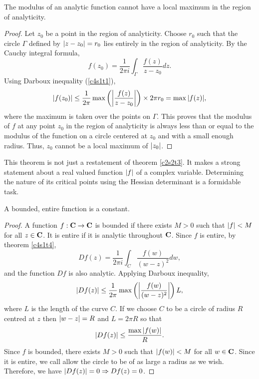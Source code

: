 \begin{thm}\label{c4s2t1}
The modulus of an analytic function cannot have a local maximum in the region
of analyticity.
\end{thm}
\begin{proof}
Let $z_0$ be a point in the region of analyticity. Choose $r_0$ such that the
circle $\Gamma$ defined by $\left\vert{z - z_0}\right\vert = r_0$ lies entirely in the region
of analyticity. By the Cauchy integral formula,
\[
f(z_0) = \frac{1}{2\pi i}\int_\Gamma \frac{f(z)}{z - z_0}dz.
\]
Using Darboux inequality (\ref{c4s1t1}),
\[
\left\vert{f(z_0)}\right\vert \le \frac{1}{2\pi}\max\left(\left\vert{\frac{f(z)}{z - z_0}}\right\vert\right)
\times 2\pi r_0 = \max{\left\vert{f(z)}\right\vert},
\]
where the maximum is taken over the points on $\Gamma$. This proves that the
modulus of $f$ at any point $z_0$ in the region of analyticity is always less
than or equal to the modulus of the function on a circle centered at $z_0$
and with a small enough radius. Thus, $z_0$ cannot be a local maximum of
$\left\vert{z_0}\right\vert$.
\end{proof}

\begin{rem}
This theorem is not just a restatement of theorem \ref{c2s2t3}. It makes a 
strong statement about a real valued function $\left\vert{f}\right\vert$ of a complex variable.
Determining the nature of its critical points using the Hessian determinant is
a formidable task.
\end{rem}

\begin{thm}\label{c4s2t2}
A bounded, entire function is a constant.
\end{thm}
\begin{proof}
A function $f:\mathbf{C}\rightarrow\mathbf{C}$ is bounded if there exists $M > 0$ such that 
$\left\vert{f}\right\vert < M$ for all $z \in \mathbf{C}$. It is entire if it is analytic throughout
$\mathbf{C}$. Since $f$ is entire, by theorem \ref{c4s1t4},
\[
Df(z) = \frac{1}{2\pi i}\int_C \frac{f(w)}{(w - z)^2}dw,
\]
and the function $Df$ is also analytic. Applying Darboux inequality,
\[
\left\vert{Df(z)}\right\vert \le \frac{1}{2\pi}\max\left(\left\vert{\frac{f(w)}{(w-z)^2}}\right\vert\right)L,
\]
where $L$ is the length of the curve $C$. If we choose $C$ to be a circle
of radius $R$ centred at $z$ then $\left\vert{w - z}\right\vert = R$ and $L = 2\pi R$ so that
\[
\left\vert{Df(z)}\right\vert \le \frac{\max{\left\vert{f(w)}\right\vert}}{R}.
\]
Since $f$ is bounded, there exists $M > 0$ such that $\left\vert{f(w)}\right\vert < M$ for
all $w \in \mathbf{C}$. Since it is entire, we call allow the circle to be of as 
large a radius as we wish. Therefore, we have $\left\vert{Df(z)}\right\vert = 0 \Rightarrow
Df(z) = 0$.
\end{proof}

